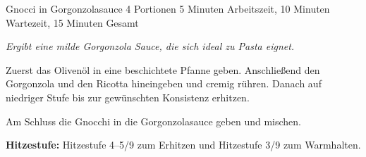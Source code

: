 \begin{recipe}{Gnocci in Gorgonzolasauce} {4 Portionen} {5 Minuten Arbeitszeit, 10 Minuten Wartezeit, 15 Minuten Gesamt}

  \freeform{}\textit{Ergibt eine milde Gorgonzola Sauce, die sich ideal zu Pasta eignet.}


  Zuerst das Olivenöl in eine beschichtete Pfanne geben.
  Anschließend den Gorgonzola und den Ricotta hineingeben und cremig rühren.
  Danach auf niedriger Stufe bis zur gewünschten Konsistenz erhitzen.

  
  Am Schluss die Gnocchi in die Gorgonzolasauce geben und mischen.

  \freeform{}\hrulefill{}

  \freeform{}\textbf{Hitzestufe:}
  Hitzestufe 4–5/9 zum Erhitzen und Hitzestufe 3/9 zum Warmhalten.

\end{recipe}
